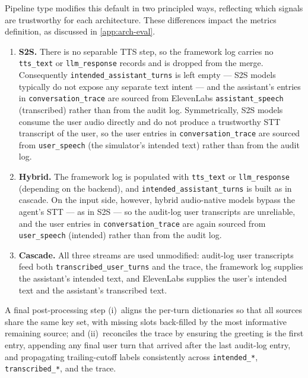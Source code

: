

Pipeline type modifies this default in two principled ways, reflecting which signals are trustworthy for each architecture. These differences impact the metrics definition, as discussed in \ref{app:arch-eval}.
\begin{enumerate}
    \item \textbf{S2S.} There is no separable TTS step, so the framework log carries no \texttt{tts\_text} or \texttt{llm\_response} records and is dropped from the merge. Consequently \texttt{intended\_assistant\_turns} is left empty --- S2S models typically do not expose any separate text intent --- and the assistant's entries in \texttt{conversation\_trace} are sourced from ElevenLabs \texttt{assistant\_speech} (transcribed) rather than from the audit log. Symmetrically, S2S models consume the user audio directly and do not produce a trustworthy STT transcript of the user, so the user entries in \texttt{conversation\_trace} are sourced from \texttt{user\_speech} (the simulator's intended text) rather than from the audit log.
    \item \textbf{Hybrid.} The framework log is populated with \texttt{tts\_text} or \texttt{llm\_response} (depending on the backend), and \texttt{intended\_assistant\_turns} is built as in cascade. On the input side, however, hybrid audio-native models bypass the agent's STT --- as in S2S --- so the audit-log user transcripts are unreliable, and the user entries in \texttt{conversation\_trace} are again sourced from \texttt{user\_speech} (intended) rather than from the audit log.
    \item \textbf{Cascade.} All three streams are used unmodified: audit-log user transcripts feed both \texttt{transcribed\_user\_turns} and the trace, the framework log supplies the assistant's intended text, and ElevenLabs supplies the user's intended text and the assistant's transcribed text.
\end{enumerate}

A final post-processing step (i)~aligns the per-turn dictionaries so that all sources share the same key set, with missing slots back-filled by the most informative remaining source; and (ii)~reconciles the trace by ensuring the greeting is the first entry, appending any final user turn that arrived after the last audit-log entry, and propagating trailing-cutoff labels consistently across \texttt{intended\_*}, \texttt{transcribed\_*}, and the trace.

